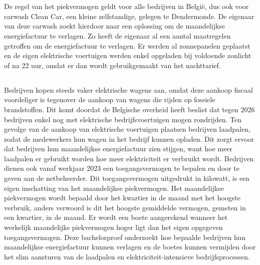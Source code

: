 
\chapter{}%
\label{ch:inleiding}

De regel van het piekvermogen geldt voor alle bedrijven in België, dus ook voor carwash Clean Car, een kleine zelfstandige, gelegen te Dendermonde. De eigenaar van deze carwash zoekt hierdoor naar een oplossing om de maandelijkse energiefactuur te verlagen. Zo heeft de eigenaar al een aantal maatregelen getroffen om de energiefactuur te verlagen. Er werden al zonnepanelen geplaatst en de eigen elektrische voertuigen werden enkel opgeladen bij voldoende zonlicht of na 22 uur, omdat er dan wordt gebruikgemaakt van het nachttarief.

\pagebreak

\section{}%
\label{sec:probleemstelling}

Bedrijven kopen steeds vaker elektrische wagens aan, omdat deze aankoop fiscaal voordeliger is tegenover de aankoop van wagens die rijden op fossiele brandstoffen. Dit komt doordat de Belgische overheid heeft beslist dat tegen 2026 bedrijven enkel nog met elektrische bedrijfsvoertuigen mogen rondrijden. Ten gevolge van de aankoop van elektrische voertuigen plaatsen bedrijven laadpalen, zodat de medewerkers hun wagen in het bedrijf kunnen opladen. Dit zorgt ervoor dat bedrijven hun maandelijkse energiefactuur zien stijgen, want hoe meer laadpalen er gebruikt worden hoe meer elektriciteit er verbruikt wordt. Bedrijven dienen ook vanaf werkjaar 2023 een toegangsvermogen te bepalen en door te geven aan de netbeheerder. Dit toegangsvermogen uitgedrukt in kilowatt, is een eigen inschatting van het maandelijkse piekvermogen. Het maandelijkse piekvermogen wordt bepaald door het kwartier in de maand met het hoogste verbruik, anders verwoord is dit het hoogste gemiddelde vermogen, gemeten in een kwartier, in de maand. Er wordt een boete aangerekend wanneer het werkelijk maandelijks piekvermogen hoger ligt dan het eigen opgegeven toegangsvermogen. Deze bachelorproef onderzoekt hoe bepaalde bedrijven hun maandelijkse energiefactuur kunnen verlagen en de boetes kunnen vermijden door het slim aansturen van de laadpalen en elektriciteit-intensieve bedrijfsprocessen.

